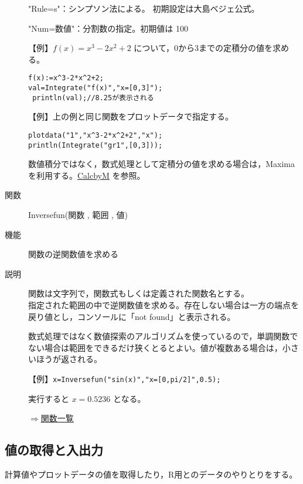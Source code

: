 \documentclass[papersize,a4paper,10pt,uplatex]{jsarticle}
\begin{document}
\begin{description}
"Rule=s"：シンプソン法による。 初期設定は大島ベジェ公式。

"Num=数値"：分割数の指定。初期値は 100 

\vspace{\baselineskip}
【例】$f(x)=x^3-2x^2+2$ について，0から3までの定積分の値を求める。
\begin{verbatim}
f(x):=x^3-2*x^2+2;
val=Integrate("f(x)","x=[0,3]");
 println(val);//8.25が表示される
\end{verbatim}

\vspace{\baselineskip}
【例】上の例と同じ関数をプロットデータで指定する。
\begin{verbatim}
plotdata("1","x^3-2*x^2+2","x");
println(Integrate("gr1",[0,3]));
\end{verbatim}

数値積分ではなく，数式処理として定積分の値を求める場合は，Maxima を利用する。\hyperlink{calcbyM}{CalcbyM}
を参照。

\vspace{\baselineskip}
\hypertarget{inversefun}{}
\item[関数]Inversefun(関数 , 範囲 , 値)
\item[機能]関数の逆関数値を求める
\item[説明]関数は文字列で，関数式もしくは定義された関数名とする。\\
指定された範囲の中で逆関数値を求める。存在しない場合は一方の端点を戻り値とし，コンソールに「not found」と表示される。

数式処理ではなく数値探索のアルゴリズムを使っているので，単調関数でない場合は範囲をできるだけ狭くとるとよい。値が複数ある場合は，小さいほうが返される。


\vspace{\baselineskip}
【例】\verb|x=Inversefun("sin(x)","x=[0,pi/2]",0.5);|

実行すると $x=0.5236$ となる。
\begin{flushright}\hyperlink{functionlist}{$\Rightarrow$関数一覧}\end{flushright}

\end{description}

\subsection{値の取得と入出力}

計算値やプロットデータの値を取得したり，R用とのデータのやりとりをする。
\end{document}

